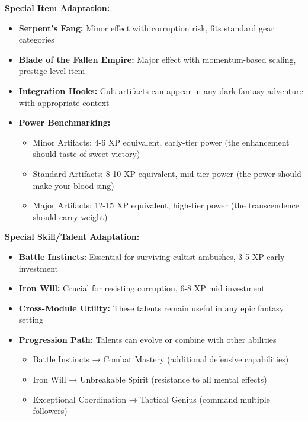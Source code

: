 \documentclass[11pt]{article}
\begin{document}
\begin{itemize}
\textbf{Special Item Adaptation:}
\begin{itemize}
\item \textbf{Serpent's Fang:} Minor effect with corruption risk, fits standard gear categories
\item \textbf{Blade of the Fallen Empire:} Major effect with momentum-based scaling, prestige-level item
\item \textbf{Integration Hooks:} Cult artifacts can appear in any dark fantasy adventure with appropriate context
\item \textbf{Power Benchmarking:} 
  \begin{itemize}
  \item Minor Artifacts: 4-6 XP equivalent, early-tier power (the enhancement should taste of sweet victory)
  \item Standard Artifacts: 8-10 XP equivalent, mid-tier power (the power should make your blood sing)
  \item Major Artifacts: 12-15 XP equivalent, high-tier power (the transcendence should carry weight)
  \end{itemize}
\end{itemize}

\textbf{Special Skill/Talent Adaptation:}
\begin{itemize}
\item \textbf{Battle Instincts:} Essential for surviving cultist ambushes, 3-5 XP early investment
\item \textbf{Iron Will:} Crucial for resisting corruption, 6-8 XP mid investment
\item \textbf{Cross-Module Utility:} These talents remain useful in any epic fantasy setting
\item \textbf{Progression Path:} Talents can evolve or combine with other abilities
  \begin{itemize}
  \item Battle Instincts → Combat Mastery (additional defensive capabilities)
  \item Iron Will → Unbreakable Spirit (resistance to all mental effects)
  \item Exceptional Coordination → Tactical Genius (command multiple followers)
  \end{itemize}
\end{itemize}


\end{itemize}
\end{document}
